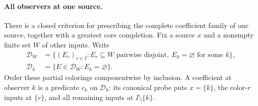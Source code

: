 \paragraph{All observers at one source.}
There is a closed criterion for prescribing the complete coefficient
family of one source, together with a greatest core completion.
Fix a source $x$ and a nonempty finite set $W$ of other inputs.
Write
\[
\begin{aligned}
 \mathcal D_W&=\{(E_r)_{r\in I}:E_r\subseteq W\text{ pairwise disjoint},
                    \ E_k=\varnothing\text{ for some }k\},\\
 \mathcal D_k&=\{E\in\mathcal D_W:E_k=\varnothing\}.
\end{aligned}
\]
Order these partial colorings componentwise by inclusion. A coefficient
at observer $k$ is a predicate $c_k$ on $\mathcal D_k$: its canonical
probe puts $x=\{k\}$, the color-$r$ inputs at $\{r\}$, and all remaining
inputs at $I\setminus\{k\}$.

